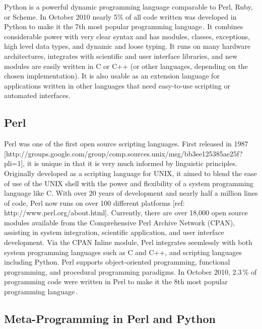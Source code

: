 \documentclass[10pt]{article}
\begin{document}
Python is a powerful dynamic programming language comparable to Perl,
Ruby, or Scheme. In October 2010 nearly 5\% of all code written was
developed in Python to make it the 7th most popular programming
language\,\cite{software09:_tiobe_progr_commun_index}. It combines
considerable power with very clear syntax and has modules, classes,
exceptions, high level data types, and dynamic
and loose typing. It runs on many hardware architectures, integrates
with scientific and user interface libraries, and new modules are
easily written in C or C++ (or other languages, depending on the
chosen implementation). It is also usable as an extension language for
applications written in other languages that need easy-to-use
scripting or automated interfaces.


\subsection*{Perl}

Perl was one of the first open source scripting languages. First
released in 1987
[http://groups.google.com/group/comp.sources.unix/msg/bb3ee125385ae25f?pli=1],
it is unique in that it is very much informed by linguistic
principles.  Originally developed as a scripting language for UNIX, it
aimed to blend the ease of use of the UNIX shell with the power and
flexibility of a system programming language like C.  With over 20
years of development and nearly half a million lines of code, Perl now
runs on over 100 different platforms [ref:
http://www.perl.org/about.html].  Currently, there are over 18,000
open source modules available from the Comprehensive Perl Archive
Network (CPAN), assisting in system integration, scientific
application, and user interface development.  Via the CPAN Inline
module, Perl integrates seemlessly with both system programming
languages such as C and C++, and scripting languages including Python.
Perl supports object-oriented programming, functional programming, and
procedural programming paradigms. In October 2010,
2.3\,\% of programming code were written in Perl to make
it the 8th most popular programming
language\,\cite{software09:_tiobe_progr_commun_index}.

\subsection*{Meta-Programming in Perl and Python}
\end{document}
